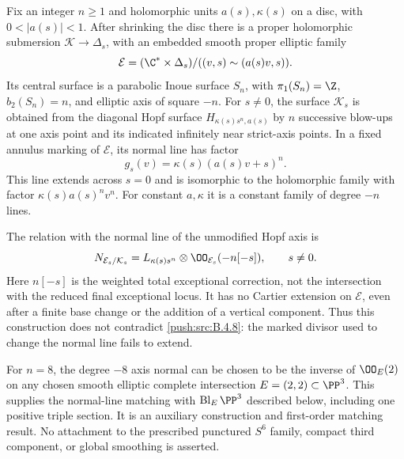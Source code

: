 \begin{proposition}
Fix an integer $n\ge1$ and holomorphic units $a(s),\kappa(s)$ on a
disc, with $0<|a(s)|<1$. After shrinking the disc there is a proper
holomorphic submersion $\mathcal K\to\Delta_s$, with an embedded smooth
proper elliptic family
\[
 \mathcal E=(\C^*\times\Delta_s)/
       ((v,s)\sim(a(s)v,s)).
\]
Its central surface is a parabolic Inoue surface $S_n$, with
$\pi_1(S_n)=\Z$, $b_2(S_n)=n$, and elliptic axis of square $-n$.
For $s\ne0$, the surface $\mathcal K_s$ is obtained from the diagonal
Hopf surface $H_{\kappa(s)s^n,a(s)}$ by $n$ successive blow-ups at one
axis point and its indicated infinitely near strict-axis points.
In a fixed annulus marking of $\mathcal E$, its normal line has factor
\[
 g_s(v)=\kappa(s)(a(s)v+s)^n.
\]
This line extends across $s=0$ and is isomorphic to the holomorphic
family with factor $\kappa(s)a(s)^n v^n$.
For constant $a,\kappa$ it is a constant family of degree $-n$ lines.

The relation with the normal line of the unmodified Hopf axis is
\[
 N_{\mathcal E_s/\mathcal K_s}
   =L_{\kappa(s)s^n}\otimes\OO_{\mathcal E_s}(-n[-s]),
       \qquad s\ne0.
\]
Here $n[-s]$ is the weighted total exceptional correction, not the
intersection with the reduced final exceptional locus. It has no
Cartier extension on $\mathcal E$, even after a finite base change or
the addition of a vertical component. Thus this construction does
not contradict \ref{push:src:B.4.8}: the marked divisor used to change the normal
line fails to extend.

For $n=8$, the degree $-8$ axis normal can be chosen to be the inverse
of $\OO_E(2)$ on any chosen smooth elliptic complete intersection
$E=(2,2)\subset\PP^3$. This supplies the normal-line matching with
$\operatorname{Bl}_E\PP^3$ described below, including one positive
triple section. It is an auxiliary construction and first-order
matching result. No attachment to the prescribed punctured
$S^6$ family, compact third component, or global smoothing is asserted.
\end{proposition}


